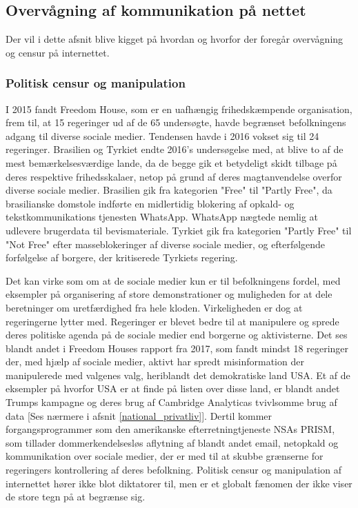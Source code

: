 \subsection{Overvågning af kommunikation på nettet}
Der vil i dette afsnit blive kigget på hvordan og hvorfor der foregår overvågning og censur på internettet.

\subsubsection{Politisk censur og manipulation}
\label{politisk_censur}
I 2015 fandt Freedom House, som er en uafhængig frihedskæmpende organisation, frem til, at 15 regeringer ud af de 65 undersøgte, havde begrænset befolkningens adgang til diverse sociale medier.\cite{FreedomHouseRapport2016} Tendensen havde i 2016 vokset sig til 24 regeringer.\cite{FreedomHouseRapport2016} Brasilien og Tyrkiet endte 2016's undersøgelse med, at blive to af de mest bemærkelsesværdige lande, da de begge gik et betydeligt skidt tilbage på deres respektive frihedsskalaer, netop på grund af deres magtanvendelse overfor diverse sociale medier. Brasilien gik fra kategorien "Free" til "Partly Free", da brasilianske domstole indførte en midlertidig blokering af opkald- og tekstkommunikations tjenesten WhatsApp. WhatsApp nægtede nemlig at udlevere brugerdata til bevismateriale. Tyrkiet gik fra kategorien "Partly Free" til "Not Free" efter masseblokeringer af diverse sociale medier, og efterfølgende forfølgelse af borgere, der kritiserede Tyrkiets regering.\cite{FreedomHouseRapport2016}

Det kan virke som om at de sociale medier kun er til befolkningens fordel, med eksempler på organisering af store demonstrationer og muligheden for at dele beretninger om uretfærdighed fra hele kloden. Virkeligheden er dog at regeringerne lytter med. Regeringer er blevet bedre til at manipulere og sprede deres politiske agenda på de sociale medier end borgerne og aktivisterne.\cite{SocialHelpDictators} Det ses blandt andet i Freedom Houses rapport fra 2017, som fandt mindst 18 regeringer der, med hjælp af sociale medier, aktivt har spredt misinformation der manipulerede med valgenes valg, heriblandt det demokratiske land USA.\cite{FreedomHouseRapport2017} Et af de eksempler på hvorfor USA er at finde på listen over disse land, er blandt andet Trumps kampagne og deres brug af Cambridge Analyticas tvivlsomme brug af data [Ses nærmere i afsnit \ref{national_privatliv}].\cite{Cambridge_Analytica_Zuckerberg}
Dertil kommer forgangsprogrammer som den amerikanske efterretningtjeneste NSAs PRISM, som tillader dommerkendelsesløs aflytning af blandt andet email, netopkald og kommunikation over sociale medier,\cite{PRISM} der er med til at skubbe grænserne for regeringers kontrollering af deres befolkning. Politisk censur og manipulation af internettet hører ikke blot diktatorer til, men er et globalt fænomen der ikke viser de store tegn på at begrænse sig.\cite{FreedomHouseRapport2017}

